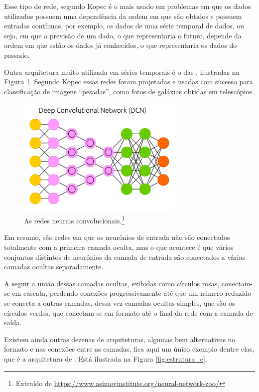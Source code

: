 Esse tipo de rede, segundo Kopec \citep{classic} é o mais usado em problemas em que os dados utilizados possuem uma dependência da ordem em que são obtidos e possuem entradas contínuas, por exemplo, os dados de uma série temporal de dados, ou seja, em que a previsão de um dado, o que representaria o futuro, depende da ordem em que estão os dados já conhecidos, o que representaria os dados do passado.

Outra arquitetura muito utilizada em séries temporais é o das , ilustradas na Figura \ref{fig:estrutura_c}.  Segundo Kopec \citep{classic} essas redes foram projetadas e usadas com sucesso para classificação de imagens ``pesadas'', como fotos de galáxias obtidas em telescópios.

\begin{figure}[htb]
\centering
\includegraphics[width=8cm]{figuras/estrutura_c}
\caption{As redes neurais convolucionais.\footnote{Extraído de \url{https://www.asimovinstitute.org/neural-network-zoo/}}}
\label{fig:estrutura_c}
\end{figure}

Em resumo, são redes em que os neurônios de entrada não são conectados totalmente com a primeira camada oculta, mas o que acontece é que vários conjuntos distintos de neurônios da camada de entrada são conectados a várias camadas ocultas separadamente.

A seguir a união dessas camadas ocultas, exibidas como círculos rosas, conectam-se em cascata, perdendo conexões progressivamente até que um número reduzido se conecta a outras camadas, dessa vez camadas ocultas simples, que são os círculos verdes, que conectam-se em formato  até o final da rede com a camada de saída. 

Existem ainda outras dezenas de arquiteturas, algumas bem alternativas no formato e nas conexões entre as camadas, fica aqui um único exemplo dentre elas, que é a arquitetura de . Está ilustrada na Figura \ref{fig:estrutura_e}.


